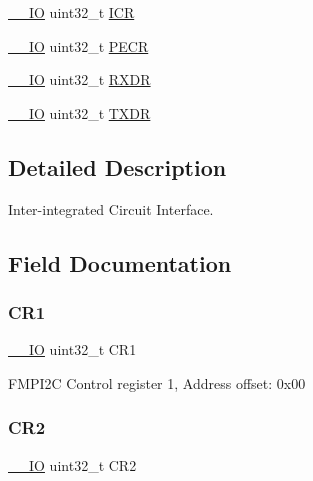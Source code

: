 \begin{DoxyCompactItemize}
\mbox{\hyperlink{core__sc300_8h_aec43007d9998a0a0e01faede4133d6be}{\+\_\+\+\_\+\+IO}} uint32\+\_\+t \mbox{\hyperlink{struct_f_m_p_i2_c___type_def_a0a8c8230846fd8ff154b9fde8dfa0399}{I\+CR}}
\item 
\mbox{\hyperlink{core__sc300_8h_aec43007d9998a0a0e01faede4133d6be}{\+\_\+\+\_\+\+IO}} uint32\+\_\+t \mbox{\hyperlink{struct_f_m_p_i2_c___type_def_af427631ab4515bb1f16bf5869682c18b}{P\+E\+CR}}
\item 
\mbox{\hyperlink{core__sc300_8h_aec43007d9998a0a0e01faede4133d6be}{\+\_\+\+\_\+\+IO}} uint32\+\_\+t \mbox{\hyperlink{struct_f_m_p_i2_c___type_def_a9bf29a9104cb5569823ab892174f9c8c}{R\+X\+DR}}
\item 
\mbox{\hyperlink{core__sc300_8h_aec43007d9998a0a0e01faede4133d6be}{\+\_\+\+\_\+\+IO}} uint32\+\_\+t \mbox{\hyperlink{struct_f_m_p_i2_c___type_def_ad7e8d785fff2acfeb8814e43bda8dd72}{T\+X\+DR}}
\end{DoxyCompactItemize}


\subsection{Detailed Description}
Inter-\/integrated Circuit Interface. 

\subsection{Field Documentation}
\mbox{\label{struct_f_m_p_i2_c___type_def_ab0ec7102960640751d44e92ddac994f0}} 
\subsubsection{\texorpdfstring{C\+R1}{CR1}}
{\footnotesize\ttfamily \mbox{\hyperlink{core__sc300_8h_aec43007d9998a0a0e01faede4133d6be}{\+\_\+\+\_\+\+IO}} uint32\+\_\+t C\+R1}

F\+M\+P\+I2C Control register 1, Address offset\+: 0x00 \mbox{\label{struct_f_m_p_i2_c___type_def_afdfa307571967afb1d97943e982b6586}} 
\subsubsection{\texorpdfstring{C\+R2}{CR2}}
{\footnotesize\ttfamily \mbox{\hyperlink{core__sc300_8h_aec43007d9998a0a0e01faede4133d6be}{\+\_\+\+\_\+\+IO}} uint32\+\_\+t C\+R2}

